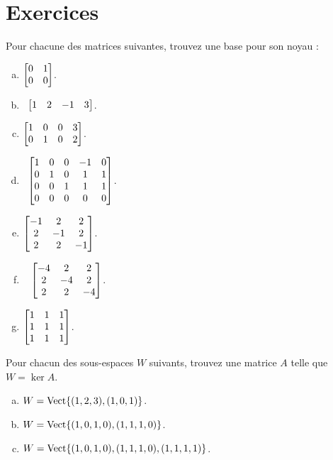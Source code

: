 \section*{Exercices}

\begin{prob} \label{prob15.1} Pour chacune des matrices suivantes, trouvez une base pour son noyau :

\begin{enumerate}[(a)]
\item $\bmatrix  0 & 1  \\
 0 & 0 \endbmatrix$.
\medskip
 
\item\sov~$\bmatrix  1 & 2 & -1 & 3 \endbmatrix$.
\medskip
 
\item $\bmatrix  1 & 0 & 0 & 3  \\
 0 & 1 & 0 & 2   \\
 \endbmatrix$.
\medskip
 
\item\sov~$ \bmatrix 
1& 0& 0& -1& 0\\  
0& 1& 0& 1&1\\ 
0& 0& 1& 1& 1\\ 
0& 0& 0& 0& 0\endbmatrix$.
\medskip
 
\item $\bmatrix
-1&2&2\\ 2&-1&2\\ 2&2&-1 \endbmatrix$.
\medskip
 
\item\sov~ $\bmatrix
-4&2&2\\ 2&-4&2\\ 2&2&-4 \endbmatrix$.
\medskip
 
\item  $\bmatrix
1&1&1\\ 1&1&1\\1&1&1 \endbmatrix$.
\medskip
 
\end{enumerate}
\end{prob}

\begin{prob} \label{prob15.2}  Pour chacun des sous-espaces $W$ suivants, trouvez une matrice $A$ telle que $W=\ker A$.

\begin{enumerate}[(a)]
\item $W=\sp{(1,2,3), (1,0,1)}$.
\medskip
 
\item $W=\sp{(1,0,1,0), (1,1,1,0)}$.
\medskip
 
\item $W=\sp{(1,0,1,0), (1,1,1,0), (1,1,1,1)}$.
\end{enumerate}
\end{prob}